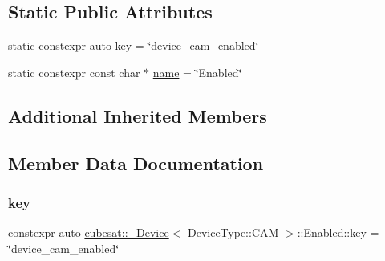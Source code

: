 \subsection*{Static Public Attributes}
\begin{DoxyCompactItemize}
\item 
static constexpr auto \hyperlink{structcubesat_1_1__Device_3_01DeviceType_1_1CAM_01_4_1_1Enabled_a2f0346db0f6b63be787a6820d87ff2a7}{key} = \char`\"{}device\+\_\+cam\+\_\+enabled\char`\"{}
\item 
static constexpr const char $\ast$ \hyperlink{structcubesat_1_1__Device_3_01DeviceType_1_1CAM_01_4_1_1Enabled_a1ac40378f608c3d6581db037d3ccba1c}{name} = \char`\"{}Enabled\char`\"{}
\end{DoxyCompactItemize}
\subsection*{Additional Inherited Members}


\subsection{Member Data Documentation}
\mbox{\label{structcubesat_1_1__Device_3_01DeviceType_1_1CAM_01_4_1_1Enabled_a2f0346db0f6b63be787a6820d87ff2a7}} 
\subsubsection{\texorpdfstring{key}{key}}
{\footnotesize\ttfamily constexpr auto \hyperlink{structcubesat_1_1__Device}{cubesat\+::\+\_\+\+Device}$<$ Device\+Type\+::\+C\+AM $>$\+::Enabled\+::key = \char`\"{}device\+\_\+cam\+\_\+enabled\char`\"{}\hspace{0.3cm}{\ttfamily [static]}}

\mbox{\label{structcubesat_1_1__Device_3_01DeviceType_1_1CAM_01_4_1_1Enabled_a1ac40378f608c3d6581db037d3ccba1c}} 

